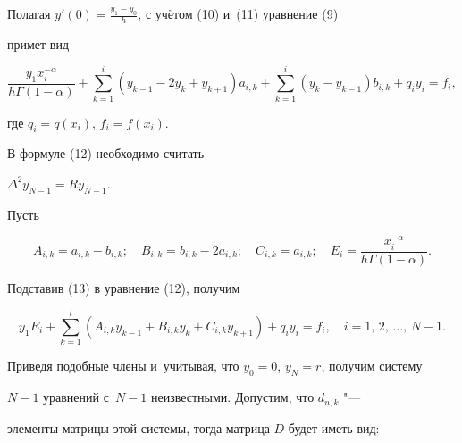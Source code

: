  

Полагая $y'(0)=\frac{y_1-y_0}h$, с учётом (10) и~(11) уравнение (9) 

примет вид 

\begin{equation} 

\label{ch12} 

\frac{y_1 x^{-\alpha}_i}{h \Gamma(1-\alpha)}+\sum\limits_{k=1}^i 

(y_{k-1}-2y_k+y_{k+1})a_{i,k}+\sum\limits_{k=1}^i 

(y_k-y_{k-1})b_{i,k}+q_i y_i=f_i, 

\end{equation} 

где $q_i=q(x_i)$, $f_i=f(x_i)$. 

 

В формуле (12) необходимо считать 

$\Delta^2 y_{N-1}=R y_{N-1}. $ 

 

Пусть  

\begin{equation} 

\label{ch13} 

A_{i,k}=a_{i,k}-b_{i,k};\quad B_{i,k}=b_{i,k}-2a_{i,k};\quad 

C_{i,k}=a_{i,k};\quad E_i=\frac{x_i^{-\alpha}}{h\Gamma(1-\alpha)}. 

\end{equation} 

Подставив (13) в уравнение (12), получим

\begin{equation} 

\label{ch14} 

y_1 E_i + \sum\limits_{k=1}^i (A_{i,k} y_{k-1}+B_{i,k}y_k +C_{i,k} 

y_{k+1})+q_iy_i=f_i, \quad i=1,\,2,\, \dots,\, N{-}1. 

\end{equation} 

 

Приведя подобные члены и~учитывая, что $y_0=0$, $y_N=r$, получим систему  

$N{-}1$ уравнений с~\mbox{$N{-}1$} неизвестными. Допустим, что $d_{n,k}$ "---  

элементы матрицы этой системы, тогда матрица $D$ будет иметь вид: 

